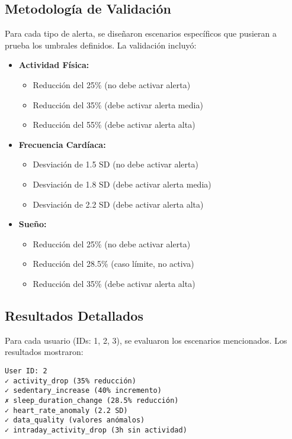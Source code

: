 \subsection{Metodología de Validación}
Para cada tipo de alerta, se diseñaron escenarios específicos que pusieran a prueba los umbrales definidos. La validación incluyó:

\begin{itemize}
    \item \textbf{Actividad Física:}
    \begin{itemize}
        \item Reducción del 25\% (no debe activar alerta)
        \item Reducción del 35\% (debe activar alerta media)
        \item Reducción del 55\% (debe activar alerta alta)
    \end{itemize}
    
    \item \textbf{Frecuencia Cardíaca:}
    \begin{itemize}
        \item Desviación de 1.5 SD (no debe activar alerta)
        \item Desviación de 1.8 SD (debe activar alerta media)
        \item Desviación de 2.2 SD (debe activar alerta alta)
    \end{itemize}
    
    \item \textbf{Sueño:}
    \begin{itemize}
        \item Reducción del 25\% (no debe activar alerta)
        \item Reducción del 28.5\% (caso límite, no activa)
        \item Reducción del 35\% (debe activar alerta alta)
    \end{itemize}
\end{itemize}

\subsection{Resultados Detallados}

Para cada usuario (IDs: 1, 2, 3), se evaluaron los escenarios mencionados. Los resultados mostraron:

\begin{verbatim}
User ID: 2
✓ activity_drop (35% reducción)
✓ sedentary_increase (40% incremento)
✗ sleep_duration_change (28.5% reducción)
✓ heart_rate_anomaly (2.2 SD)
✓ data_quality (valores anómalos)
✓ intraday_activity_drop (3h sin actividad)
\end{verbatim}

